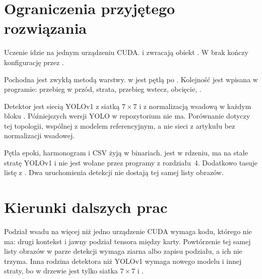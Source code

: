\section{Ograniczenia przyjętego rozwiązania}

Uczenie idzie na jednym urządzeniu CUDA.  i  zwracają obiekt . W  brak  kończy konfigurację przez .

Pochodna jest zwykłą metodą warstwy.  w  jest pętlą po . Kolejność jest wpisana w programie: przebieg w przód, strata, przebieg wstecz, obcięcie, .

Detektor jest siecią YOLOv1 z siatką \(7\times 7\) i z normalizacją wsadową w każdym bloku . Późniejszych wersji YOLO w repozytorium nie ma. Porównanie dotyczy tej topologii, wspólnej z modelem referencyjnym, a nie sieci z artykułu bez normalizacji wsadowej.

Pętla epoki, harmonogram i CSV żyją w binariach.  jest w rdzeniu, ma na stałe stratę YOLOv1 i nie jest wołane przez programy z rozdziału~4. Dodatkowo  tasuje listę z . Dwa uruchomienia detekcji nie dostają tej samej listy obrazów.

\section{Kierunki dalszych prac}

Podział wsadu na więcej niż jedno urządzenie CUDA wymaga kodu, którego nie ma: drugi kontekst i jawny podział tensora między karty. Powtórzenie tej samej listy obrazów w parze detekcji wymaga ziarna albo zapisu podziału, a  ich nie trzyma. Inna rodzina detektora niż YOLOv1 wymaga nowego modelu i innej straty, bo w drzewie jest tylko siatka \(7\times 7\) i .
